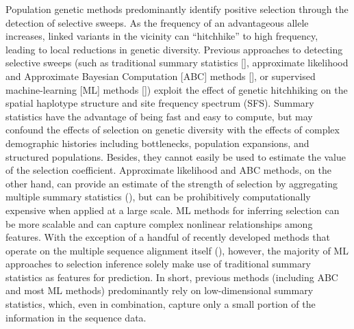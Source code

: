 Population genetic methods predominantly identify positive selection throu\-gh the detection of selective sweeps. As the frequency of an advantageous allele increases, linked variants in the vicinity can “hitchhike” to high frequency, leading to local reductions in genetic diversity. Previous approaches to detecting selective sweeps (such as traditional summary statistics [\cite{tajima_statistical_1989}], approximate likelihood and Approximate Bayesian Computation [ABC] methods [\cite{peter_distinguishing_2012}], or supervised machine-learning [ML] methods [\cite{schrider_shic_2016, kern_diploshic_2018}]) exploit the effect of genetic hitchhiking on the spatial haplotype structure and site frequency spectrum (SFS). Summary statistics have the advantage of being fast and easy to compute, but may confound the effects of selection on genetic diversity with the effects of complex demographic histories including bottlenecks, population expansions, and structured populations. Besides, they cannot easily be used to estimate the value of the selection coefficient. Approximate likelihood and ABC methods, on the other hand, can provide an estimate of the strength of selection by aggregating multiple summary statistics (\cite{peter_distinguishing_2012}), but can be prohibitively computationally expensive when applied at a large scale. ML methods for inferring selection can be more scalable and can capture complex nonlinear relationships among features. With the exception of a handful of recently developed methods that operate on the multiple sequence alignment itself (\cite{flagel_unreasonable_2019,torada_imagene_2019}), however, the majority of ML approaches to selection inference solely make use of traditional summary statistics as features for prediction. In short, previous methods (including ABC and most ML methods) predominantly rely on low-dimensional summary statistics, which, even in combination, capture only a small portion of the information in the sequence data.

